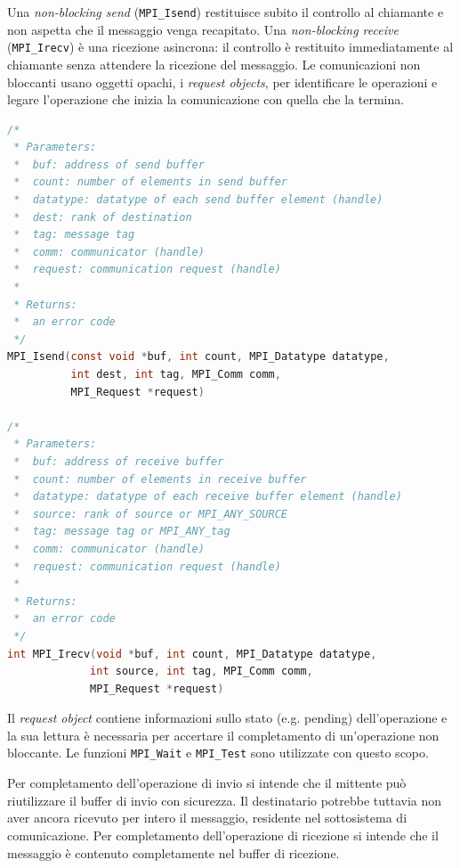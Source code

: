 Una \textit{non-blocking send} (\texttt{MPI\_Isend}) restituisce subito il controllo al chiamante e non aspetta che il messaggio venga recapitato. 
Una \textit{non-blocking receive} (\texttt{MPI\_Irecv}) è una ricezione asincrona: il controllo è restituito immediatamente al chiamante senza attendere la ricezione del messaggio. 
Le comunicazioni non bloccanti usano oggetti opachi, i \emph{request objects}, per identificare le operazioni e legare l'operazione che inizia la comunicazione con quella che la termina.

\begin{lstlisting}[language=C, numbers=none]
/*
 * Parameters:
 *  buf: address of send buffer
 *  count: number of elements in send buffer
 *  datatype: datatype of each send buffer element (handle)
 *  dest: rank of destination
 *  tag: message tag
 *  comm: communicator (handle)
 *  request: communication request (handle)
 * 
 * Returns:
 *  an error code
 */
MPI_Isend(const void *buf, int count, MPI_Datatype datatype,
          int dest, int tag, MPI_Comm comm,
          MPI_Request *request)

/*
 * Parameters:
 *  buf: address of receive buffer
 *  count: number of elements in receive buffer
 *  datatype: datatype of each receive buffer element (handle)
 *  source: rank of source or MPI_ANY_SOURCE
 *  tag: message tag or MPI_ANY_tag
 *  comm: communicator (handle)
 *  request: communication request (handle)
 * 
 * Returns:
 *  an error code
 */
int MPI_Irecv(void *buf, int count, MPI_Datatype datatype,
             int source, int tag, MPI_Comm comm,
             MPI_Request *request)
\end{lstlisting}

Il \emph{request object} contiene informazioni sullo stato (e.g. pending) dell'operazione e la sua lettura è necessaria per accertare il completamento di un'operazione non bloccante.
Le funzioni \texttt{MPI\_Wait} e \texttt{MPI\_Test} sono utilizzate con questo scopo.

\begin{note}{}
    Per completamento dell'operazione di invio si intende che il mittente può riutilizzare il buffer di invio con sicurezza.
    Il destinatario potrebbe tuttavia non aver ancora ricevuto per intero il messaggio, residente nel sottosistema di comunicazione.
    Per completamento dell'operazione di ricezione si intende che il messaggio è contenuto completamente nel buffer di ricezione.
\end{note}

